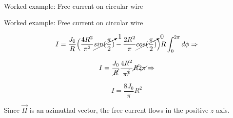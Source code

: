 {\begin{frame}{Worked example: Free current on circular wire}
\end{frame}

%
%
%

\begin{frame}{Worked example: Free current on circular wire}

  \begin{equation*}
    I = \frac{J_0}{R}
     \Big(\frac{4R^2}{\pi^2} \cancelto{1}{sin(\frac{\pi}{2})} - \frac{2R^2}{\pi} \cancelto{0}{cos(\frac{\pi}{2})} \Big)
      R \int_{0}^{2\pi} d\phi \Rightarrow
  \end{equation*}

  \begin{equation*}
    I = \frac{J_0}{\cancel{R}} \frac{4R^2}{\pi^{\cancel{2}}} \cancel{R} 2\cancel{\pi} \Rightarrow
  \end{equation*}

  \begin{equation*}
    I = \frac{8 J_0}{\pi} R^2
  \end{equation*}

  Since $\vec{H}$ is an azimuthal vector,
  the free current flows in the positive $z$ axis.

\end{frame}

} %


%
%

